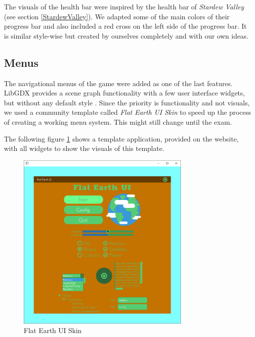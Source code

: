 \documentclass[12p]{article}
\begin{document}
The visuals of the health bar were inspired by the health bar of \emph{Stardew Valley} (see section \ref{StardewValley}). We adapted some of the main colors of their progress bar and also included a red cross on the left side of the progress bar. It is similar style-wise but created by ourselves completely and with our own ideas.


\subsection{Menus} \label{VisualDocMenus}

The navigational menus of the game were added as one of the last features. LibGDX provides a scene graph functionality with a few user interface widgets, but without any default style \cite{Scene2DUI}. Since the priority is functionality and not visuals, we used a community template called \emph{Flat Earth UI Skin} \cite{FlatEarthUISkin} to speed up the process of creating a working menu system. This might still change until the exam.

The following figure \ref{fig:flat_earth_ui_skin} shows a template application, provided on the website, with all widgets to show the visuals of this template.

\begin{figure}[ht]
  \center
  \includegraphics[width=0.75\textwidth]{Documentation/preview.png}
  \caption{Flat Earth UI Skin \cite{FlatEarthUISkin}}
  \label{fig:flat_earth_ui_skin}
\end{figure}
\end{document}

